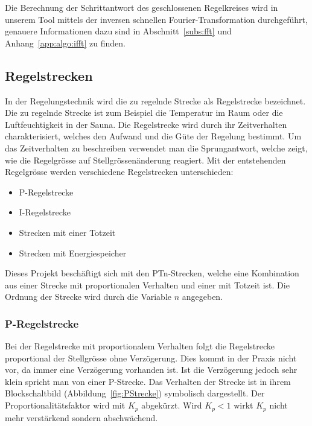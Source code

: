 Die  Berechnung   der  Schrittantwort  des  geschlossenen   Regelkreises  wird
in  unserem   Tool  mittels  der  inversen   schnellen  Fourier-Transformation
durchgef\"uhrt, genauere  Informationen dazu sind  in Abschnitt~\ref{subs:fft}
und Anhang~\ref{app:algo:ifft} zu finden.


\subsection{Regelstrecken}

In  der  Regelungstechnik  wird  die  zu  regelnde  Strecke  als  Regelstrecke
bezeichnet. Die  zu   regelnde  Strecke   ist  zum  Beispiel   die  Temperatur
im  Raum  oder  die  Luftfeuchtigkeit  in  der  Sauna. Die  Regelstrecke  wird
durch  ihr   Zeitverhalten  charakterisiert,  welches  den   Aufwand  und  die
G\"ute   der   Regelung   bestimmt. Um  das   Zeitverhalten   zu   beschreiben
verwendet  man die  Sprungantwort,  welche zeigt,  wie  die Regelgr\"osse  auf
Stellgr\"ossen\"anderung reagiert. Mit  der entstehenden  Regelgr\"osse werden
verschiedene Regelstrecken unterschieden:

\begin{itemize}
    \item
        P-Regelstrecke
    \item
        I-Regelstrecke
    \item
        Strecken mit einer Totzeit
    \item
        Strecken mit Energiespeicher
\end{itemize}

Dieses  Projekt   besch\"aftigt  sich   mit  den  PTn-Strecken,   welche  eine
Kombination  aus einer  Strecke  mit proportionalen  Verhalten  und einer  mit
Totzeit ist. Die Ordnung der Strecke wird durch die Variable $n$ angegeben.


\subsubsection*{P-Regelstrecke}
Bei  der  Regelstrecke mit  proportionalem  Verhalten  folgt die  Regelstrecke
proportional der  Stellgr\"osse ohne  Verz\"ogerung. Dies kommt in  der Praxis
nicht vor,  da immer eine  Verz\"ogerung vorhanden ist. Ist  die Verz\"ogerung
jedoch  sehr  klein  spricht  man   von  einer  P-Strecke. Das  Verhalten  der
Strecke ist in ihrem Blockschaltbild (Abbildung~\ref{fig:PStrecke}) symbolisch
dargestellt. Der  Proportionalit\"atsfaktor wird  mit $K_p$  abgek\"urzt. Wird
$K_p<1$ wirkt $K_p$ nicht mehr verst\"arkend sondern abschw\"achend.

